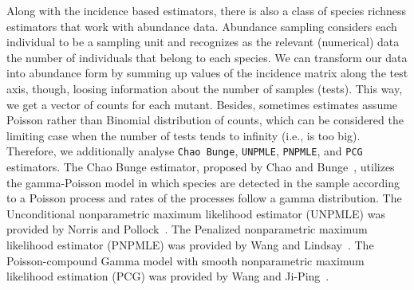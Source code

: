 \documentclass[sigconf,review,anonymous]{acmart}
\newcommand{\ChaoBunge}{Chao Bunge\xspace}
\def\<#1>{\texttt{#1}}
\begin{document}
Along with the incidence based estimators, there is also a class of species richness estimators that work with abundance data.
Abundance sampling considers each individual to be a sampling unit
and recognizes as the relevant (numerical) data the number of individuals
that belong to each species.
%
We can transform our data into abundance form by summing up values of the incidence matrix along the test axis,
though, loosing information about the number of samples (tests). This way, we get a vector of counts for each mutant.
Besides, sometimes estimates assume Poisson rather than Binomial distribution of counts, which can be considered the limiting case when the number of tests tends to infinity (i.e., is too big).
%
Therefore, we additionally analyse \<\ChaoBunge>, \<UNPMLE>, \<PNPMLE>, and \<PCG> estimators.
The \ChaoBunge estimator, proposed by Chao and Bunge~\cite{chao2002estimating},
utilizes the gamma-Poisson model in which species are detected in the sample
according to a Poisson process and rates of the processes follow a gamma distribution.
%
The Unconditional nonparametric maximum likelihood estimator (UNPMLE)
was provided by Norris and Pollock~\cite{norris1998non}.
%
The Penalized nonparametric maximum likelihood estimator (PNPMLE)
was provided by Wang and Lindsay~\cite{wang2005penalized}.
%
The Poisson-compound Gamma model with smooth nonparametric maximum likelihood estimation (PCG)
was provided by Wang and Ji-Ping~\cite{wang2010estimating}.



\end{document}
